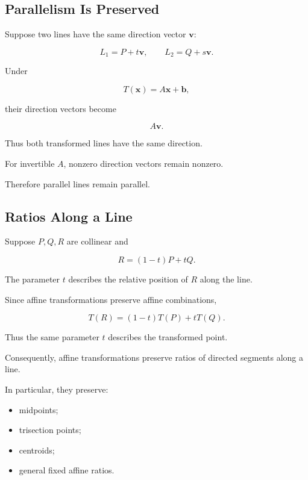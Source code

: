 \subsection{Parallelism Is Preserved}
\label{subsec:affine-parallelism}

Suppose two lines have the same direction vector \(\mathbf{v}\):

\[
L_1=P+t\mathbf{v},
\qquad
L_2=Q+s\mathbf{v}.
\]

Under

\[ T(\mathbf{x})=A\mathbf{x}+\mathbf{b}, \]

their direction vectors become

\[ A\mathbf{v}. \]

Thus both transformed lines have the same direction.

For invertible \(A\), nonzero direction vectors remain nonzero.

Therefore parallel lines remain parallel.

\subsection{Ratios Along a Line}
\label{subsec:affine-ratios-line}

Suppose \(P,Q,R\) are collinear and

\[ R=(1-t)P+tQ. \]

The parameter \(t\) describes the relative position of \(R\) along the line.

Since affine transformations preserve affine combinations,

\[
T(R)
=
(1-t)T(P)+tT(Q).
\]

Thus the same parameter \(t\) describes the transformed point.

Consequently, affine transformations preserve ratios of directed segments
along a line.

In particular, they preserve:

\begin{itemize}
    \item midpoints;
    \item trisection points;
    \item centroids;
    \item general fixed affine ratios.
\end{itemize}


